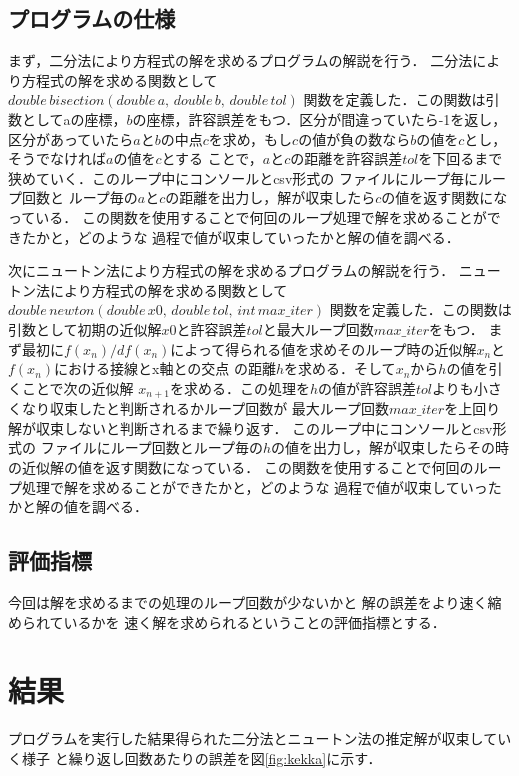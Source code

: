 \documentclass[uplatex]{jsarticle}
\begin{document}
\subsection{プログラムの仕様}

まず，二分法により方程式の解を求めるプログラムの解説を行う．
二分法により方程式の解を求める関数として $double\,bisection(double\,a,\,double\,b,\,double\,tol)$
関数を定義した．この関数は引数としてaの座標，$b$の座標，許容誤差をもつ．区分が間違っていたら-1を返し，
区分があっていたら$a$と$b$の中点$c$を求め，もし$c$の値が負の数なら$b$の値を$c$とし，そうでなければ$a$の値を$c$とする
ことで，$a$と$c$の距離を許容誤差$tol$を下回るまで狭めていく．このループ中にコンソールとcsv形式の
ファイルにループ毎にループ回数と
ループ毎の$a$と$c$の距離を出力し，解が収束したら$c$の値を返す関数になっている．
この関数を使用することで何回のループ処理で解を求めることができたかと，どのような
過程で値が収束していったかと解の値を調べる．

次にニュートン法により方程式の解を求めるプログラムの解説を行う．
ニュートン法により方程式の解を求める関数として $double\,newton(double\,x0,\,double\,tol,\,int\,max\_iter)$
関数を定義した．この関数は引数として初期の近似解$x0$と許容誤差$tol$と最大ループ回数$max\_iter$をもつ．
まず最初に$f(x_n) / df(x_n)$によって得られる値を求めそのループ時の近似解$x_n$と$f(x_n)$における接線とx軸との交点
の距離$h$を求める．そして$x_n$から$h$の値を引くことで次の近似解
$x_{n+1}$を求める．この処理を$h$の値が許容誤差$tol$よりも小さくなり収束したと判断されるかループ回数が
最大ループ回数$max\_iter$を上回り解が収束しないと判断されるまで繰り返す．
このループ中にコンソールとcsv形式の
ファイルにループ回数とループ毎の$h$の値を出力し，解が収束したらその時の近似解の値を返す関数になっている．
この関数を使用することで何回のループ処理で解を求めることができたかと，どのような
過程で値が収束していったかと解の値を調べる．


\subsection{評価指標}
今回は解を求めるまでの処理のループ回数が少ないかと
解の誤差をより速く縮められているかを
速く解を求められるということの評価指標とする．

\section{結果}
プログラムを実行した結果得られた二分法とニュートン法の推定解が収束していく様子
と繰り返し回数あたりの誤差を図\ref{fig:kekka}に示す．
\end{document}
